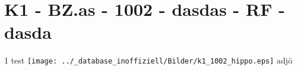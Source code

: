 \section{K1 - BZ.as - 1002 - dasdas - RF - dasda}

\begin{langesbeispiel} \item[1] %
test \texttt{[image: ../\_database\_inoffiziell/Bilder/k1\_1002\_hippo.eps]} adjö
\end{langesbeispiel}
